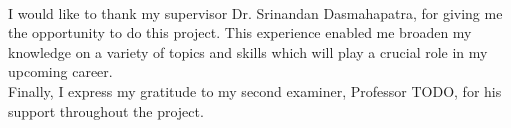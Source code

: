 

\begin{acknowledgements}
\\
I would like to thank my supervisor Dr. Srinandan Dasmahapatra, for giving me the opportunity to do this project. This experience enabled me broaden my knowledge on a variety of topics and skills which will play a crucial role in my upcoming career. \\

Finally, I express my gratitude to my second examiner, Professor TODO, for his support throughout the project. 

\end{acknowledgements}
